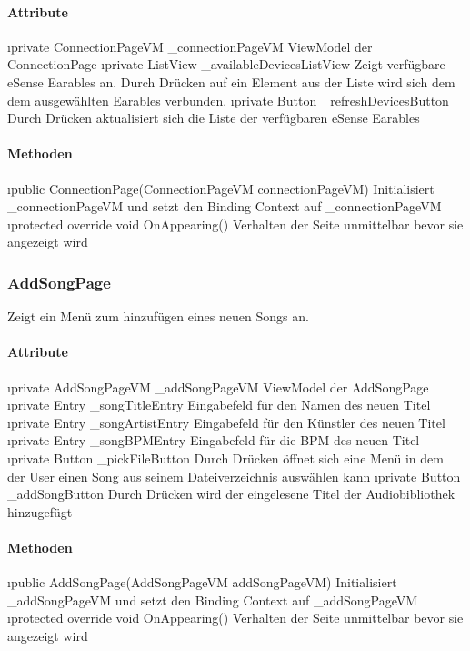 \documentclass[../entwurf.tex]{subfiles}
\begin{document}
\paragraph{Attribute}
\begin{itemize}
	\i{private ConnectionPageVM \_connectionPageVM} ViewModel der ConnectionPage
	\i{private ListView \_availableDevicesListView} Zeigt verfügbare eSense Earables an. Durch Drücken auf ein Element aus der Liste wird sich dem dem ausgewählten Earables verbunden. 
	\i{private Button \_refreshDevicesButton} Durch Drücken aktualisiert sich die Liste der verfügbaren eSense Earables
\end{itemize}

\paragraph{Methoden}
\begin{itemize}
	\i{public ConnectionPage(ConnectionPageVM connectionPageVM)} Initialisiert \_connectionPageVM und setzt den Binding Context 			auf \_connectionPageVM
	\i{protected override void OnAppearing()} Verhalten der Seite unmittelbar bevor sie angezeigt wird
\end{itemize}

\subsubsection{AddSongPage}
Zeigt ein Menü zum hinzufügen eines neuen Songs an.  
\paragraph{Attribute}
\begin{itemize}
	\i{private AddSongPageVM \_addSongPageVM} ViewModel der AddSongPage
	\i{private Entry \_songTitleEntry} Eingabefeld für den Namen des neuen Titel
	\i{private Entry \_songArtistEntry} Eingabefeld für den Künstler des neuen Titel
	\i{private Entry \_songBPMEntry} Eingabefeld für die BPM des neuen Titel
	\i{private Button \_pickFileButton} Durch Drücken öffnet sich eine Menü in dem der User einen Song aus seinem Dateiverzeichnis auswählen kann
	\i{private Button \_addSongButton} Durch Drücken wird der eingelesene Titel der Audiobibliothek hinzugefügt
\end{itemize}

\paragraph{Methoden}
\begin{itemize}
	\i{public AddSongPage(AddSongPageVM addSongPageVM)} Initialisiert \_addSongPageVM und setzt den Binding Context 			auf \_addSongPageVM
	\i{protected override void OnAppearing()} Verhalten der Seite unmittelbar bevor sie angezeigt wird
\end{itemize}
\end{document}
